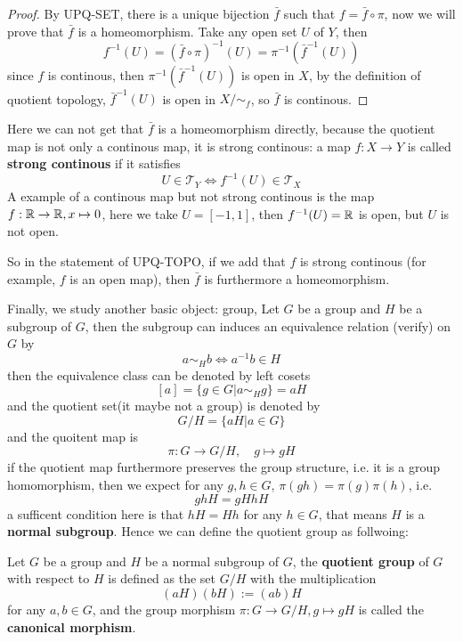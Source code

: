 \documentclass[12pt,a4paper]{article}
\begin{document}
\begin{proof}
    By UPQ-SET, there is a unique bijection \(\bar{f}\) such that \(f = \bar{f} \circ \pi\), now we will prove that \(\bar{f}\) is a homeomorphism. Take any open set \(U\) of \(Y\), then 
    \[f^{-1}(U) = (\bar{f} \circ \pi)^{-1}(U) = \pi^{-1}(\bar{f}^{-1}(U))\]
    since \(f\) is continous, then \(\pi^{-1}(\bar{f}^{-1}(U))\) is open in \(X\), by the definition of quotient topology, \(\bar{f}^{-1}(U)\) is open in \(X/\sim_f\), so \(\bar{f}\) is continous.
\end{proof}

\begin{remark}
    Here we can not get that \(\bar{f}\) is a homeomorphism directly, because the quotient map is not only a continous map, it is strong continous: a map 
    \(f:X \to Y\) is called \textbf{strong continous} if it satisfies
    \[U \in \mathcal{T}_Y  \iff f^{-1}(U) \in \mathcal{T}_X\]
    A example of a continous map but not strong continous is the map \(f: \mathbb{R} \to \mathbb{R}, x \mapsto 0\), here we take \(U=[-1,1]\), then \(f^{-1}(U) = \mathbb{R}\) is open, but \(U\) is not open. 

    So in the statement of UPQ-TOPO, if we add that \(f\) is strong continous (for example, \(f\) is an open map), then \(\bar{f}\) is furthermore a homeomorphism.
\end{remark}

Finally, we study another basic object: group, Let \(G\) be a group and \(H\) be a subgroup of \(G\), then the subgroup can induces an equivalence relation (verify) on \(G\) by
\[a \sim_H b \iff a^{-1}b \in H\]
then the equivalence class can be denoted by left cosets
\[[a] = \{g \in G | a \sim_H g\} = aH\]
and the quotient set(it maybe not a group) is denoted by
\[G/H = \{aH | a \in G\}\]
and the quoitent map is
\[\pi: G \to G/H, \quad g \mapsto gH\]
if the quotient map furthermore preserves the group structure, i.e. it is a group homomorphism, then we expect for any \(g,h \in G\), \(\pi(gh) = \pi(g)\pi(h)\), i.e.
\[ghH = gHhH\]
a sufficent condition here is that \(hH = Hh\) for any \(h \in G\), that means \(H\) is a \textbf{normal subgroup}. Hence we can define the quotient group as follwoing:
\begin{definition}
    Let \(G\) be a group and \(H\) be a normal subgroup of \(G\), the \textbf{quotient group} of \(G\) with respect to \(H\) is defined as the set \(G/H\) with the multiplication
    \[(aH)(bH) := (ab)H\]
    for any \(a,b \in G\), and the group morphism \(\pi: G \to G/H, g \mapsto gH\) is called the \textbf{canonical morphism}.
\end{definition}
\end{document}
